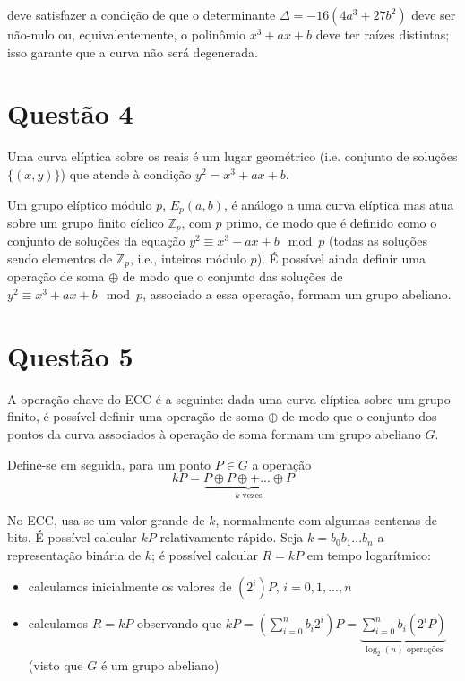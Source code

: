 \documentclass{article}
\begin{document}
deve satisfazer a condição de que o determinante $\Delta = -16 (4a^3 + 27b^2)$ deve ser não-nulo ou, equivalentemente, o polinômio $x^3 + ax + b$ deve ter raízes distintas; isso garante que a curva não será degenerada.

\section*{Questão 4}

Uma curva elíptica sobre os reais é um lugar geométrico (i.e. conjunto de soluções $\{(x,y)\}$) que atende à condição $y^2 = x^3 + ax + b$.

Um grupo elíptico módulo $p$, $E_p(a,b)$, é análogo a uma curva elíptica mas atua sobre um grupo finito cíclico $\mathbb{Z}_p$, com $p$ primo, de modo que é definido como o conjunto de soluções da equação $y^2 \equiv x^3 + ax + b \mod p$ (todas as soluções sendo elementos de $\mathbb{Z}_p$, i.e., inteiros módulo $p$). É possível ainda definir uma operação de soma $\oplus$ de modo que o conjunto das soluções de $y^2 \equiv x^3 + ax + b \mod p$, associado a essa operação, formam um grupo abeliano.

\section*{Questão 5}

A operação-chave do ECC é a seguinte: dada uma curva elíptica sobre um grupo finito, é possível definir uma operação de soma $\oplus$ de modo que o conjunto dos pontos da curva associados à operação de soma formam um grupo abeliano $G$.

Define-se em seguida, para um ponto $P \in G$ a operação 
\begin{equation*}
    kP = \underbrace{P \oplus P \oplus + ... \oplus P}_{k\text{ vezes}}
\end{equation*}

No ECC, usa-se um valor grande de $k$, normalmente com algumas centenas de bits. É possível calcular $kP$ relativamente rápido. Seja $k = b_0 b_1 ... b_{n}$ a representação binária de $k$; é possível calcular $R = kP$ em tempo logarítmico:

\begin{itemize}
    \item calculamos inicialmente os valores de $(2^i)P$, $i = {0,1,...,n}$
    \item calculamos $R = kP$ observando que $kP = (\sum_{i=0}^{n} b_i2^{i})P = \underbrace{\sum_{i=0}^{n}b_i(2^{i}P)}_{\log_2(n) \text{ operações}}$ (visto que $G$ é um grupo abeliano)
\end{itemize}
\end{document}

